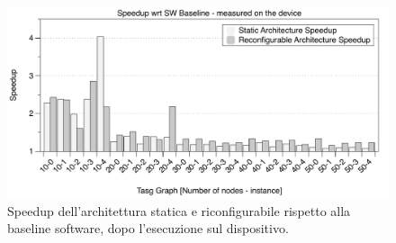\begin{figure}[b]
 \begin{center}
  \includegraphics[width=\textwidth]{./capitoli/figure/cap6/FPL_Runtime.pdf}
  \caption{Speedup dell'architettura statica e riconfigurabile rispetto alla
  baseline software, dopo l'esecuzione sul dispositivo.}
  \label{fig:speedupBaselineRuntime}
 \end{center}
\end{figure}

